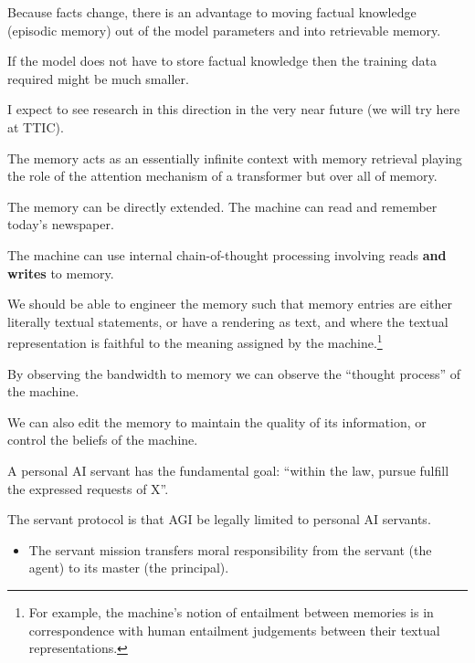 {

Because facts change, there is an advantage to moving factual knowledge (episodic memory) out of the model parameters
and into retrievable memory.

\vfill
If the model does not have to store factual knowledge then the training data required might be much smaller.

\vfill
I expect to see research in this direction in the very near future (we will try here at TTIC).


The memory acts as an essentially infinite context with memory retrieval playing the role of the attention mechanism of a transformer
but over all of memory.

\vfill
The memory can be directly extended. The machine can read and remember today's newspaper.

\vfill
The machine can use internal chain-of-thought processing involving reads {\bf and writes} to memory.


\vfill
We should be able to engineer the memory such that memory entries are either literally textual statements,
or have a rendering as text, and where the textual representation is faithful to the meaning assigned by the machine.\footnote{\Large For example, the machine's notion of entailment
between memories is in correspondence with human entailment judgements between their textual representations.}

\vfill
By observing the bandwidth to memory we can observe the ``thought process'' of the machine.

\vfill
We can also edit the memory to maintain the quality of its information, or control the beliefs of the machine.


A personal AI servant has the fundamental goal: ``within the law, pursue fulfill the expressed requests of X''.

\vfill
The servant protocol is that AGI be legally limited to personal AI servants.


\begin{itemize}
\item The servant mission transfers moral responsibility from the servant (the agent) to its master (the principal).


\end{itemize}}
